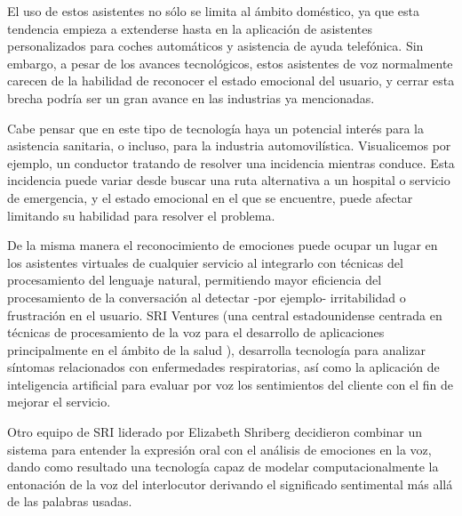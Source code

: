 \documentclass[11pt,a4paper,spanish]{book}
\begin{document}
	El uso de estos asistentes no sólo se limita al ámbito doméstico, ya que esta tendencia empieza a extenderse hasta en la aplicación de asistentes personalizados para coches automáticos y asistencia de ayuda telefónica. 
	Sin embargo, a pesar de los avances tecnológicos, estos asistentes de voz normalmente carecen de la habilidad de reconocer el estado emocional del usuario, y cerrar esta brecha podría ser un gran avance en las industrias ya mencionadas. 
	
	Cabe pensar que en este tipo de tecnología haya un potencial interés para la asistencia sanitaria, o incluso, para la industria automovilística. Visualicemos por ejemplo, un conductor tratando de resolver una incidencia mientras conduce. Esta incidencia puede variar desde buscar una ruta alternativa a un hospital o servicio de emergencia, y el estado emocional en el que se encuentre, puede afectar limitando su habilidad para resolver el problema. 
	
	De la misma manera el reconocimiento de emociones puede ocupar un lugar en los asistentes virtuales de cualquier servicio al integrarlo con técnicas del procesamiento del lenguaje natural, permitiendo mayor eficiencia del procesamiento de la conversación al detectar -por ejemplo-  irritabilidad o frustración en el usuario. 
	SRI Ventures (una central estadounidense centrada en técnicas de procesamiento de la voz para el desarrollo de aplicaciones principalmente en el ámbito de la salud  \cite{nuanceCom}), desarrolla tecnología para analizar síntomas relacionados con enfermedades respiratorias, así como la aplicación de inteligencia artificial para evaluar por voz los sentimientos del cliente con el fin de mejorar el servicio.
	
	Otro equipo de SRI liderado por Elizabeth Shriberg \cite{Shriberg2003} decidieron combinar un sistema para entender la expresión oral con el análisis de emociones en la voz, dando como resultado una tecnología capaz de modelar computacionalmente la entonación de la voz del interlocutor derivando el significado sentimental más allá de las palabras usadas.
	
    \begin{comment}
    	Por ejemplo, hay áreas con una diversidad cultural y lingüística muy amplia, sólo en Zimbabwe hay 16 lenguas oficiales, o 4 en Suiza. Yace aquí la necesidad de desvincular esta dependencia, lo que podría crear un impulso en el desarrollo de estos sistemas sin la necesidad de un corpus específico, y al mismo tiempo ayudarnos a entender la relación entre la expresión de emociones y la lengua. Es aquí donde reside el potencial de este área y por lo que cabe preguntarse si ese reconocimiento emocional a través de la voz, está fuertemente ligado al idioma y la cultura, o hay emociones que podemos detectar independientemente de este.\\
    \end{comment}
	
\end{document}
